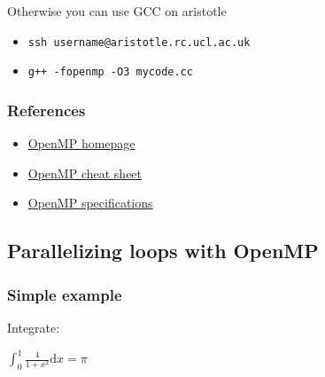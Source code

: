 Otherwise you can use GCC on aristotle

\begin{itemize}
\itemsep1pt\parskip0pt
\item
  \texttt{ssh username@aristotle.rc.ucl.ac.uk}
\item
  \texttt{g++ -fopenmp -O3 mycode.cc}
\end{itemize}

\subsubsection{References}\label{references}

\begin{itemize}
\itemsep1pt\parskip0pt
\item
  \href{http://openmp.org/}{OpenMP homepage}
\item
  \href{http://openmp.org/mp-documents/OpenMP-4.0-C.pdf}{OpenMP cheat
  sheet}
\item
  \href{http://openmp.org/wp/openmp-specifications/}{OpenMP
  specifications}
\end{itemize}

\subsection{Parallelizing loops with
OpenMP}\label{parallelizing-loops-with-openmp}

\subsubsection{Simple example}\label{simple-example}

Integrate:

$\int_0^1 \frac{4}{1+x^2} \mathrm{d}x=\pi$

